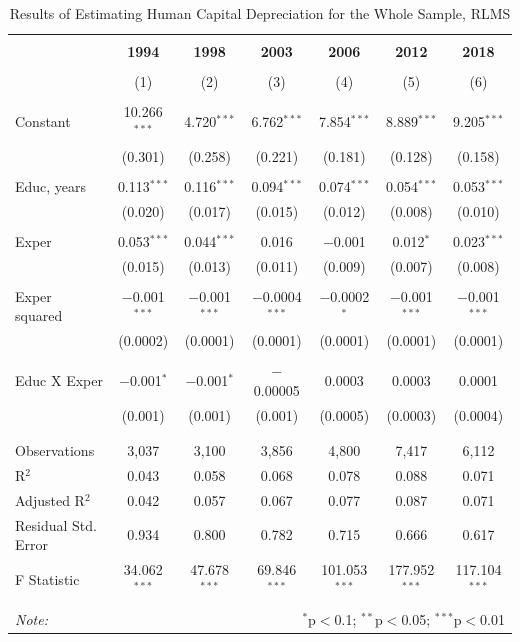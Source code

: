 \documentclass[12pt,a4paper]{article}
\numberwithin{equation}{section}
\begin{document}
\setlength{\tabcolsep}{2pt}
\begin{table}[h!]
	\centering 
	\caption{Results of Estimating Human Capital Depreciation for the Whole Sample, RLMS} 
	\label{tab:1}
	\begin{tabular}{@{\extracolsep{3pt}}lcccccc} 
		\\[-1.8ex]\hline 
		\hline \\[-1.8ex] 
		& \textbf{1994} & \textbf{1998} & \textbf{2003} & \textbf{2006} & \textbf{2012} & \textbf{2018} \\ 
		\\[-1.8ex] & (1) & (2) & (3) & (4) & (5) & (6)\\ 
		\hline \\[-1.8ex] 
		Constant & 10.266$^{***}$ & 4.720$^{***}$ & 6.762$^{***}$ & 7.854$^{***}$ & 8.889$^{***}$ & 9.205$^{***}$ \\ 
		& (0.301) & (0.258) & (0.221) & (0.181) & (0.128) & (0.158) \\ 
		& & & & & & \\ 
		Educ, years & 0.113$^{***}$ & 0.116$^{***}$ & 0.094$^{***}$ & 0.074$^{***}$ & 0.054$^{***}$ & 0.053$^{***}$ \\ 
		& (0.020) & (0.017) & (0.015) & (0.012) & (0.008) & (0.010) \\ 
		& & & & & & \\ 
		Exper & 0.053$^{***}$ & 0.044$^{***}$ & 0.016 & $-$0.001 & 0.012$^{*}$ & 0.023$^{***}$ \\ 
		& (0.015) & (0.013) & (0.011) & (0.009) & (0.007) & (0.008) \\ 
		& & & & & & \\ 
		Exper squared & $-$0.001$^{***}$ & $-$0.001$^{***}$ & $-$0.0004$^{***}$ & $-$0.0002$^{*}$ & $-$0.001$^{***}$ & $-$0.001$^{***}$ \\ 
		& (0.0002) & (0.0001) & (0.0001) & (0.0001) & (0.0001) & (0.0001) \\ 
		& & & & & & \\ 
		Educ X Exper & $-$0.001$^{*}$ & $-$0.001$^{*}$ & $-$0.00005 & 0.0003 & 0.0003 & 0.0001 \\ 
		& (0.001) & (0.001) & (0.001) & (0.0005) & (0.0003) & (0.0004) \\ 
		& & & & & & \\ 
		\hline \\[-1.8ex] 
		Observations & 3,037 & 3,100 & 3,856 & 4,800 & 7,417 & 6,112 \\ 
		R$^{2}$ & 0.043 & 0.058 & 0.068 & 0.078 & 0.088 & 0.071 \\ 
		Adjusted R$^{2}$ & 0.042 & 0.057 & 0.067 & 0.077 & 0.087 & 0.071 \\ 
		Residual Std. Error & 0.934 & 0.800 & 0.782 & 0.715 & 0.666 & 0.617 \\ 
		F Statistic & 34.062$^{***}$ & 47.678$^{***}$ & 69.846$^{***}$ & 101.053$^{***}$ & 177.952$^{***}$ & 117.104$^{***}$ \\ 
		\hline 
		\hline \\[-1.8ex] 
		\textit{Note:}  & \multicolumn{6}{r}{$^{*}$p$<$0.1; $^{**}$p$<$0.05; $^{***}$p$<$0.01} \\ 
	\end{tabular} 
\end{table}
\end{document}
